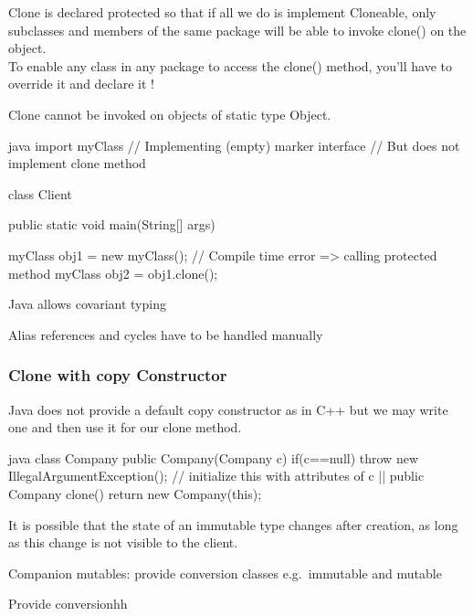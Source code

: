 \begin{notebox}\nospacing
  \begin{itemizenosep}
      \item 
  Clone is declared protected so that if all we do is implement Cloneable, only
  subclasses and members of the same package will be able to invoke clone() on
  the object.\\
  To enable any class in any package to access the clone() method, you'll have
  to override it and declare it ! 
      \item Clone cannot be invoked on objects of static type Object.
  \end{itemizenosep}
\end{notebox}
\begin{codeboxNl}{java}
  import myClass
  // Implementing (empty) marker interface
  // But does not implement clone method

  class Client{
    public static void main(String[] args){
      myClass obj1 = new myClass();
      // Compile time error => calling protected method
      myClass obj2 = obj1.clone();
      
    }
  }
\end{codeboxNl}
\begin{notebox}[Notes]\nospacing
  \begin{itemizenosep}
      \item Java allows covariant typing \label{defn:covariantTying}
      \item Alias references and cycles have to be handled manually
  \end{itemizenosep}
\end{notebox}
\subsubsection{Clone with copy Constructor}
\begin{sectionbox}\nospacing
  Java does not provide a default copy constructor as in C++ but we may write
  one and then use it for our clone method.
\end{sectionbox}
\begin{codeboxNl}{java}
class Company {
  public Company(Company c) {
    if(c==null) throw new IllegalArgumentException();
      // initialize this with attributes of c
    }
    |\optldots|
    public Company clone() {
      return new Company(this);
    }
}
\end{codeboxNl}
\begin{notebox}[Notes]\nospacing
  \begin{itemizenosep}
      \item It is possible that the state of an immutable type
       changes after creation, as long as this change is not visible to the
       client.
      \item Companion mutables: provide conversion classes e.g.\
    immutable  and mutable 
  \end{itemizenosep}
  Provide conversionhh
\end{notebox}
